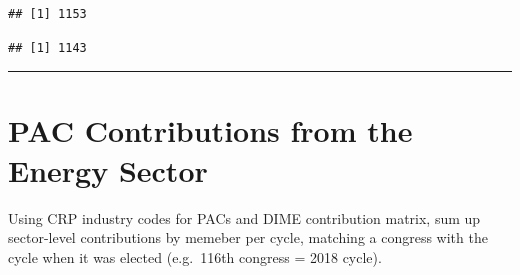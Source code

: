 \documentclass[]{article}
\newenvironment{Shaded}{\begin{snugshade}}{\end{snugshade}}
\newcommand{\KeywordTok}[1]{\textcolor[rgb]{0.13,0.29,0.53}{\textbf{#1}}}
\newcommand{\DataTypeTok}[1]{\textcolor[rgb]{0.13,0.29,0.53}{#1}}
\newcommand{\StringTok}[1]{\textcolor[rgb]{0.31,0.60,0.02}{#1}}
\newcommand{\OtherTok}[1]{\textcolor[rgb]{0.56,0.35,0.01}{#1}}
\newcommand{\OperatorTok}[1]{\textcolor[rgb]{0.81,0.36,0.00}{\textbf{#1}}}
\newcommand{\NormalTok}[1]{#1}
\begin{document}
\begin{verbatim}
## [1] 1153
\end{verbatim}

\begin{Shaded}
\end{Shaded}

\begin{verbatim}
## [1] 1143
\end{verbatim}

\begin{center}\rule{0.5\linewidth}{\linethickness}\end{center}

\section{PAC Contributions from the Energy
Sector}\label{pac-contributions-from-the-energy-sector}

Using CRP industry codes for PACs and DIME contribution matrix, sum up
sector-level contributions by memeber per cycle, matching a congress
with the cycle when it was elected (e.g.~116th congress = 2018 cycle).
\end{document}

